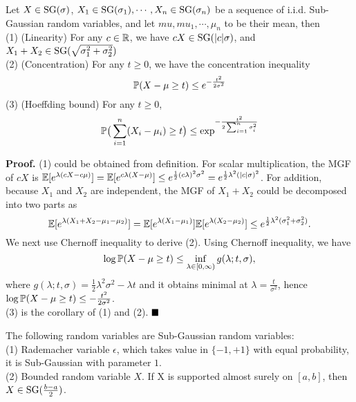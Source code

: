 \begin{proposition} Let $X\in {\mathrm{SG}}{(\sigma)}$, $X_1\in{\mathrm{SG}}{(\sigma_1)}, \cdots, X_n\in{\mathrm{SG}}{(\sigma_n)}$ be a sequence of i.i.d. Sub-Gaussian random variables, and let $mu, mu_1, \cdots, \mu_n$ to be their mean, then \\
(1) (Linearity) For any $c\in {\mathbb{R}}$, we have $cX \in {\mathrm{SG}}{(|c|\sigma)}$, and $X_1+X_2\in{\mathrm{SG}}{(\sqrt{\sigma_1^2+\sigma_2^2})}$\\
(2) (Concentration) For any $t\ge 0$, we have the concentration inequality \begin{equation}
    {\mathbb{P}}(X-\mu\ge t) \le e^{-\frac{t^2}{2\sigma^2}}
\end{equation}
(3) (Hoeffding bound) For any $t\ge 0$, 
\begin{equation}
    {\mathbb{P}}\big(\sum_{i=1}^n(X_i-\mu_i)\ge t\big)\le \exp^{-\frac{t^2}{2\sum_{i=1}^n\sigma_i^2}}
\end{equation}
\end{proposition}

\noindent \textbf{Proof.} (1) could be obtained from definition. For scalar multiplication, the MGF of $cX$ is ${\mathbb{E}}[e^{\lambda(cX-c\mu)}]={\mathbb{E}}[e^{c\lambda(X-\mu)}]\le e^{\frac{1}{2}(c\lambda)^2\sigma^2}=e^{\frac{1}{2}\lambda^2(|c|\sigma)^2}$. For addition, because $X_1$ and $X_2$ are independent, the MGF of $X_1+X_2$ could be decomposed into two parts as
\begin{equation*}
    {\mathbb{E}}[e^{\lambda(X_1+X_2-\mu_1-\mu_2)}]={\mathbb{E}}[e^{\lambda(X_1-\mu_1)}] {\mathbb{E}}[e^{\lambda(X_2-\mu_2)}] \le e^{\frac{1}{2}\lambda^2(\sigma_1^2+\sigma_2^2)}.
\end{equation*}
We next use Chernoff inequality to derive (2). Using Chernoff inequality, we have
\begin{equation*}
    \log {\mathbb{P}}(X-\mu\ge t) \le \inf_{\lambda\in [0, \infty)} g(\lambda;t,\sigma),
\end{equation*} where $g(\lambda;t,\sigma)=\frac{1}{2}\lambda^2 \sigma^2 - \lambda t$ and it obtains minimal at $\lambda=\frac{t}{\sigma^2}$, hence $\log {\mathbb{P}}(X-\mu\ge t)\le -\frac{t^2}{2\sigma^2}$.\\
(3) is the corollary of (1) and (2). $\proofend$

\begin{claim} The following random variables are Sub-Gaussian random variables: \\
(1) Rademacher variable $\epsilon$, which takes value in $\{-1,+1\}$ with equal probability, it is Sub-Gaussian with parameter $1$. \\
(2) Bounded random variable $X$. If X is supported almost surely on $[a,b]$, then $X\in {\mathrm{SG}}{(\frac{b-a}{2})}$.
\end{claim}

